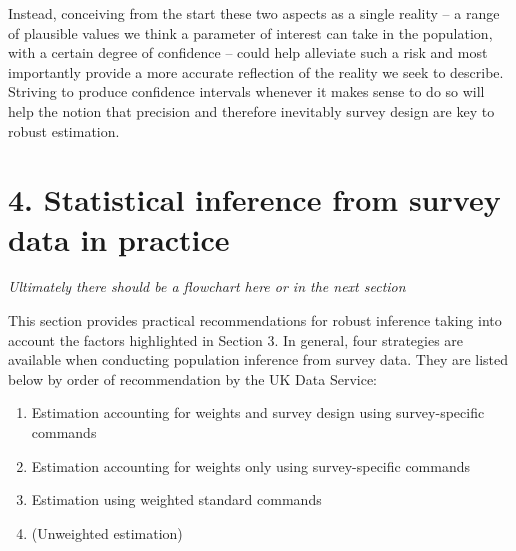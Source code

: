 \documentclass[
  14,
  a4paper,
  DIV=11,
  numbers=noendperiod]{scrartcl}
\providecommand{\tightlist}{%
  \setlength{\itemsep}{0pt}\setlength{\parskip}{0pt}}\usepackage{longtable,booktabs,array}
\begin{document}
Instead, conceiving from the start these two aspects as a single reality
-- a range of plausible values we think a parameter of interest can take
in the population, with a certain degree of confidence -- could help
alleviate such a risk and most importantly provide a more accurate
reflection of the reality we seek to describe. Striving to produce
confidence intervals whenever it makes sense to do so will help the
notion that precision and therefore inevitably survey design are key to
robust estimation.

\hypertarget{statistical-inference-from-survey-data-in-practice}{%
\section{4. Statistical inference from survey data in
practice}\label{statistical-inference-from-survey-data-in-practice}}

\emph{Ultimately there should be a flowchart here or in the next
section}

This section provides practical recommendations for robust inference
taking into account the factors highlighted in Section 3. In general,
four strategies are available when conducting population inference from
survey data. They are listed below by order of recommendation by the UK
Data Service:

\begin{enumerate}
\def\labelenumi{\arabic{enumi}.}
\tightlist
\item
  Estimation accounting for weights and survey design using
  survey-specific commands
\item
  Estimation accounting for weights only using survey-specific commands
\item
  Estimation using weighted standard commands
\item
  (Unweighted estimation)
\end{enumerate}
\end{document}
